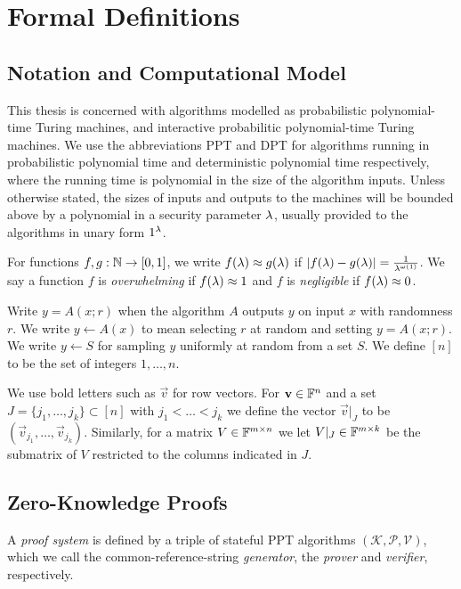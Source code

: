 \chapter{Formal Definitions}
\label{chapterlabel:Definitions}

\section{Notation and Computational Model}

This thesis is concerned with algorithms modelled as probabilistic polynomial-time Turing machines, and interactive probabilitic polynomial-time Turing machines. We use the abbreviations PPT and DPT for algorithms running in probabilistic polynomial time and deterministic polynomial time respectively, where the running time is polynomial in the size of the algorithm inputs. Unless otherwise stated, the sizes of inputs and outputs to the machines will be bounded above by a polynomial in a security parameter $\lambda$, usually provided to the algorithms in unary form $1^{\lambda}$.

For functions $f,g: \mathbb{N} \rightarrow [0,1] $, we write $f(\lambda)\approx g(\lambda) $ if 
$|f(\lambda) - g(\lambda)|= \frac{1}{\lambda^{\omega(1)}}$. We say a function $f$ is \emph{overwhelming} if 
$f(\lambda) \approx 1$ and $f$ is \emph{negligible} if $f(\lambda) \approx 0$.

Write $y=A(x;r)$ when the algorithm $A$ outputs $y$ on input $x$ with randomness $r$. We write $y \gets A(x)$ to mean selecting $r$ at random and setting $y=A(x;r)$. We write $y \gets S$ for sampling $y$ uniformly at random from a set $S$. We define $[n]$ to be the set of integers $1,\ldots,n$.

We use bold letters such as $\vec{v}$ for row vectors. For $\mathbf{v}\in \mathbb{F}^n$ and a set $J=\{j_1,\dots, j_k\}\subset [n]$ with $j_1<\dots<j_k$ we define the vector $\vec{v}|_J$ to be $(\vec{v}_{j_1},\dots, \vec{v}_{j_k})$. Similarly, for a matrix $V\in \mathbb{F}^{m\times n}$ we let $V|_{J}\in \mathbb{F}^{m\times k}$ be the submatrix of $V$ restricted to the columns indicated in $J$.

\section{Zero-Knowledge Proofs}
\label{shvzkdef}

A \emph{proof system} is defined by a triple of stateful PPT algorithms $(\mathcal{K},\mathcal{P},\mathcal{V})$, which we call the common-reference-string \emph{generator}, the \emph{prover} and \emph{verifier}, respectively.

